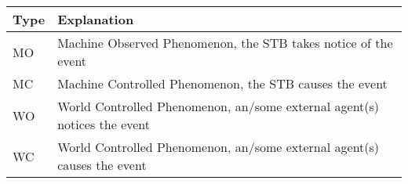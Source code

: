 \documentclass[12pt]{article}
\begin{document}
\begin{table}[H]
    \centering
    \setlength{\tabcolsep}{18pt}
    \renewcommand{\arraystretch}{1.2}
    \begin{tabularx}{\textwidth}{|>{\centering\hsize=0.3\hsize}X|>{\hsize=1.7\hsize}X|}
        \hline
        \textbf{Type} & \textbf{Explanation} \\
        \hline
        MO & Machine Observed Phenomenon, the STB takes notice of the event \\
        \hline
        MC & Machine Controlled Phenomenon, the STB causes the event \\
        \hline
        WO & World Controlled Phenomenon, an/some external agent(s) notices the event \\
        \hline
        WC & World Controlled Phenomenon, an/some external agent(s) causes the event \\
        \hline
    \end{tabularx}
    \label{tab:shared_phenomena_header}
\end{table}
\end{document}
